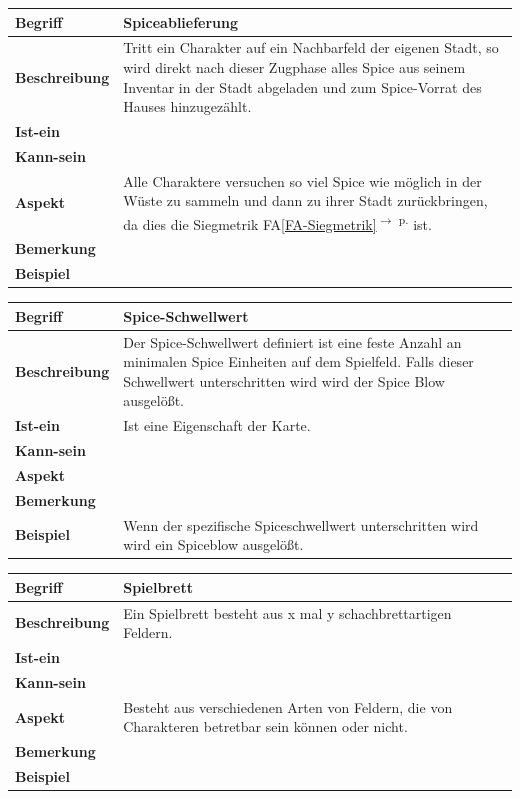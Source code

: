 \documentclass[12pt]{article}
\newcounter{fa}
\newcommand{\faref}[1]{FA\ref{#1}\textsuperscript{$\rightarrow$ p. \pageref{#1}}}
\begin{document}
\begin{tabularx}{\linewidth}{|l|X|}
\hline
\textbf{Begriff} & \textbf{Spiceablieferung} \\
\hline
\textbf{Beschreibung} & Tritt ein Charakter auf ein Nachbarfeld der eigenen Stadt, so wird direkt nach dieser Zugphase alles Spice aus seinem Inventar in der Stadt abgeladen und zum Spice-Vorrat des Hauses hinzugezählt. \\
\hline
\textbf{Ist-ein} & \\
\hline
\textbf{Kann-sein} & \\
\hline
\textbf{Aspekt} & Alle Charaktere versuchen so viel Spice wie möglich in der Wüste zu sammeln und dann zu ihrer Stadt zurückbringen, da dies die Siegmetrik \faref{FA-Siegmetrik} ist.\\
\hline
\textbf{Bemerkung} &  \\
\hline
\textbf{Beispiel} &  \\
\hline
\end{tabularx}

\begin{tabularx}{\linewidth}{|l|X|}
\hline
\textbf{Begriff} & \textbf{Spice-Schwellwert } \\
\hline
\textbf{Beschreibung} & Der Spice-Schwellwert definiert ist eine feste Anzahl an minimalen Spice Einheiten auf dem Spielfeld. Falls dieser Schwellwert unterschritten wird wird der Spice Blow ausgelößt. \\
\hline
\textbf{Ist-ein} & Ist eine Eigenschaft der Karte.\\
\hline
\textbf{Kann-sein} & \\
\hline
\textbf{Aspekt} &  \\
\hline
\textbf{Bemerkung} & \\
\hline
\textbf{Beispiel} & Wenn der spezifische Spiceschwellwert unterschritten wird wird ein Spiceblow ausgelößt. \\
\hline
\end{tabularx}

\begin{tabularx}{\linewidth}{|l|X|}
\hline
\textbf{Begriff} & \textbf{Spielbrett} \\
\hline
\textbf{Beschreibung} & Ein Spielbrett besteht aus x mal y schachbrettartigen Feldern.  \\
\hline
\textbf{Ist-ein} & \\
\hline
\textbf{Kann-sein} & \\
\hline
\textbf{Aspekt} & Besteht aus verschiedenen Arten von Feldern, die von Charakteren betretbar sein können oder nicht. \\
\hline
\textbf{Bemerkung} &  \\
\hline
\textbf{Beispiel} &  \\
\hline
\end{tabularx}
\end{document}
